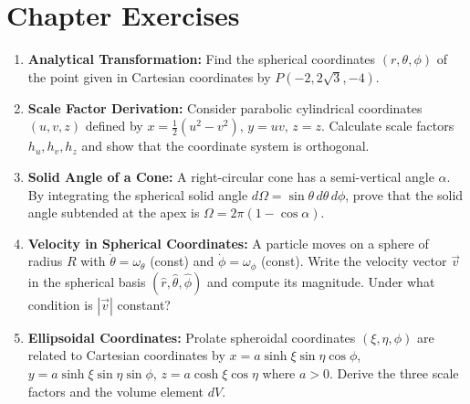 \section{Chapter Exercises}
\begin{enumerate}
    \item \textbf{Analytical Transformation:} Find the spherical coordinates $(r, \theta, \phi)$ of the point given in Cartesian coordinates by $P(-2, 2\sqrt{3}, -4)$.
    \item \textbf{Scale Factor Derivation:} Consider parabolic cylindrical coordinates $(u, v, z)$ defined by $x = \frac{1}{2}(u^2 - v^2)$, $y = uv$, $z = z$. Calculate scale factors $h_u, h_v, h_z$ and show that the coordinate system is orthogonal.
    \item \textbf{Solid Angle of a Cone:} A right-circular cone has a semi-vertical angle $\alpha$. By integrating the spherical solid angle $d\Omega = \sin\theta\,d\theta\,d\phi$, prove that the solid angle subtended at the apex is $\Omega = 2\pi(1 - \cos\alpha)$.
    \item \textbf{Velocity in Spherical Coordinates:} A particle moves on a sphere of radius $R$ with $\dot\theta = \omega_\theta$ (const) and $\dot\phi = \omega_\phi$ (const). Write the velocity vector $\vec{v}$ in the spherical basis $(\hat{r}, \hat{\theta}, \hat{\phi})$ and compute its magnitude. Under what condition is $|\vec{v}|$ constant?
    \item \textbf{Ellipsoidal Coordinates:} Prolate spheroidal coordinates $(\xi, \eta, \phi)$ are related to Cartesian coordinates by $x = a\sinh\xi\sin\eta\cos\phi$, $y = a\sinh\xi\sin\eta\sin\phi$, $z = a\cosh\xi\cos\eta$ where $a > 0$. Derive the three scale factors and the volume element $dV$.
\end{enumerate}
